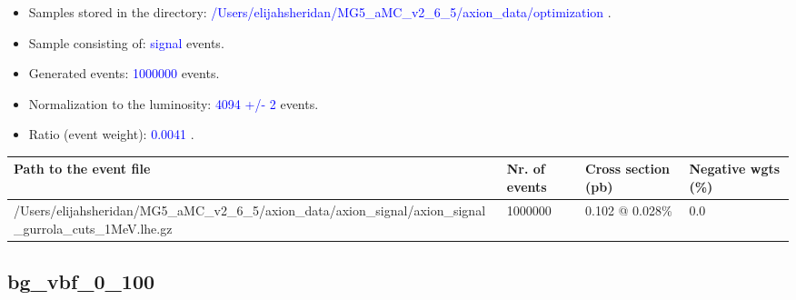\documentclass[a4paper, 10pt]{article}
\begin{document}
\begin{itemize}
  \item Samples stored in the directory: \textcolor{blue}{/\-Users/\-elijahsheridan/\-MG5\_aMC\_v2\_6\_5/\-axion\_data/\-optimization} .
   \item Sample consisting of: \textcolor{blue}{signal}  events.
   \item Generated events: \textcolor{blue}{1000000 }  events.
   \item Normalization to the luminosity: \textcolor{blue}{4094}\textcolor{blue}{ +/\-- }\textcolor{blue}{2 }  events.
   \item Ratio (event weight): \textcolor{blue}{0.0041 } .  
 
\end{itemize}
\begin{table}[H]
  \begin{center}
    \begin{tabular}{|m{55.0mm}|m{25.0mm}|m{30.0mm}|m{30.0mm}|}
      \hline
      {\cellcolor{yellow}         Path to the event file}& {\cellcolor{yellow}         Nr. of events}& {\cellcolor{yellow}         Cross section (pb)}& {\cellcolor{yellow}         Negative wgts (\%)}\\
      \hline
      {\cellcolor{white}          /\-Users/\-elijahsheridan/\-MG5\_aMC\_v2\_6\_5/\-axion\_data/\-axion\_signal/\-axion\_signal\_gurrola\_cuts\_1MeV.lhe.gz}& {\cellcolor{white}          1000000}& {\cellcolor{white}          0.102 @ 0.028\%}& {\cellcolor{white}          0.0}\\
\hline
    \end{tabular}
  \end{center}
\end{table}

\subsection{ bg\_vbf\_0\_100}
\end{document}
